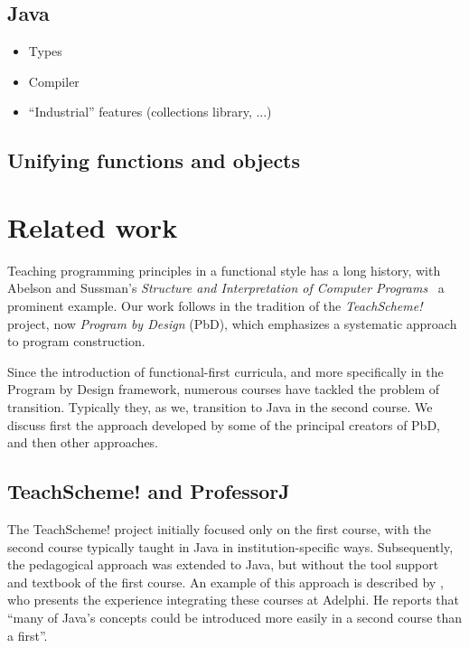 \documentclass[submission,copyright]{eptcs}
\begin{document}
\subsection{Java}

\begin{itemize}
\item Types
\item Compiler
\item ``Industrial'' features (collections library, ...)
\end{itemize}



\subsection{Unifying functions and objects}


\section{Related work}
\label{sec:related-work}

Teaching programming principles in a functional style has a long
history, with Abelson and Sussman's \emph{Structure and Interpretation
of Computer Programs}~\cite{dvanhorn:sicp} a prominent example.  Our
work follows in the tradition of the \emph{TeachScheme!} project, now
\emph{Program by Design} (PbD), which emphasizes a systematic
approach to program construction.  

Since the introduction of functional-first curricula, and more
specifically in the Program by Design framework, numerous courses have
tackled the problem of transition.  Typically they, as we, transition
to Java in the second course.  We discuss first the approach developed
by some of the principal creators of PbD, and then other approaches.

\subsection{TeachScheme! and ProfessorJ}

The TeachScheme! project initially focused only on the first course,
with the second course typically taught in Java in
institution-specific ways. Subsequently, the pedagogical approach was
extended to Java, but without the tool support and textbook of the
first course.  An example of this approach is described by
\citet{dvanhorn:Bloch2000Scheme}, who presents the experience
integrating these courses at Adelphi.  He reports that ``many of
Java's concepts could be introduced more easily in a second course
than a first''.
\end{document}

